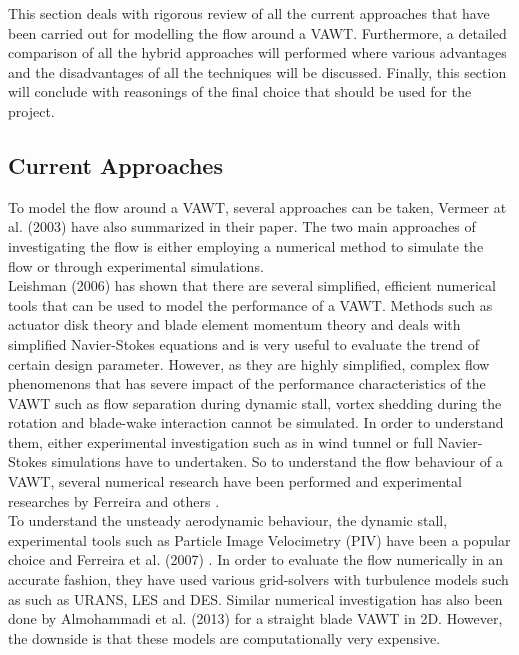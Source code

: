 This section deals with rigorous review of all the current approaches that have been carried out for modelling the flow around a VAWT. Furthermore, a detailed comparison of all the hybrid approaches will performed where various advantages and the disadvantages of all the techniques will be discussed. Finally, this section will conclude with reasonings of the final choice that should be used for the project.

\subsection{Current Approaches}

To model the flow around a VAWT, several approaches can be taken, Vermeer at al. (2003) \cite{Vermeer2003} have also summarized in their paper. The two main approaches of investigating the flow is either employing a numerical method to simulate the flow or through experimental simulations.\\


Leishman (2006) \cite{leishman2006principles} has shown that there are several simplified, efficient numerical tools that can be used to model the performance of a VAWT. Methods such as actuator disk theory and blade element momentum theory and deals with simplified Navier-Stokes equations and is very useful to evaluate the trend of certain design parameter. However, as they are highly simplified, complex flow phenomenons that has severe impact of the performance characteristics of the VAWT such as flow separation during dynamic stall, vortex shedding during the rotation and blade-wake interaction cannot be simulated. In order to understand them, either experimental investigation such as in wind tunnel or full Navier-Stokes simulations have to undertaken. So to understand the flow behaviour of a VAWT, several numerical research have been performed \cite{Almohammadi2013} \cite{Ferreira2007} \cite{Islam2008} \cite{Merz2012} and experimental researches by Ferreira \cite{SimaoFerreira2008} \cite{Ferreira} and others \cite{Howell2010} \cite{Mertens2003}.\\

To understand the unsteady aerodynamic behaviour, the dynamic stall, experimental tools such as Particle Image Velocimetry (PIV) have been a popular choice and Ferreira et al. (2007) \cite{Ferreira2007}. In order to evaluate the flow numerically in an accurate fashion, they have used various grid-solvers with turbulence models such as such as URANS, LES and DES. Similar numerical investigation has also been done by Almohammadi et al. (2013) \cite{Almohammadi2013} for a straight blade VAWT in 2D. However, the downside is that these models are computationally very expensive.\\

